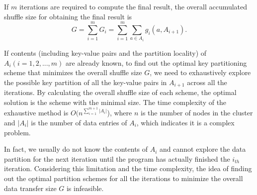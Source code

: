 \documentclass[10pt,journal,compsoc]{IEEEtran}
\newcommand{\red}[1]{\textcolor{red}{#1}}
\begin{document}

If $m$ iterations are required to compute the final result, 
the overall accumulated shuffle size for obtaining the final result is
\begin{equation}\label{eq:g}
G=\sum_{i=1}^{m} G_i=\sum_{i=1}^{m} \sum_{a \in A_i} g_i(a,A_{i+1}).
\end{equation}



If contents (including key-value pairs and the partition locality) of $A_i (i=1,2,...,m)$ are already known, to find out the optimal key partitioning scheme that minimizes 
the overall shuffle size $G$,  %
we need to exhaustively explore the possible key partition of all the key-value pairs in $A_{i+1}$ across all the iterations. 
By calculating the overall shuffle size of each scheme, the optimal solution is the scheme with the minimal size. 
The time complexity of the exhaustive method is $O(n^{\sum_{i=1}^{m+1} |A_i|}$), 
where $n$ is the number of nodes in the cluster and $|A_i|$ is the number of data entries of $A_i$, 
which indicates it is a complex problem. 

In fact, we usually do not know the contents of $A_i$ and cannot explore the data partition
for the next iteration until the program has actually finished the $i_{th}$ iteration. 
Considering this limitation and the time complexity, the idea of finding out the optimal partition schemes for all the iterations to minimize the overall data transfer size $G$ is infeasible. 
\end{document}
